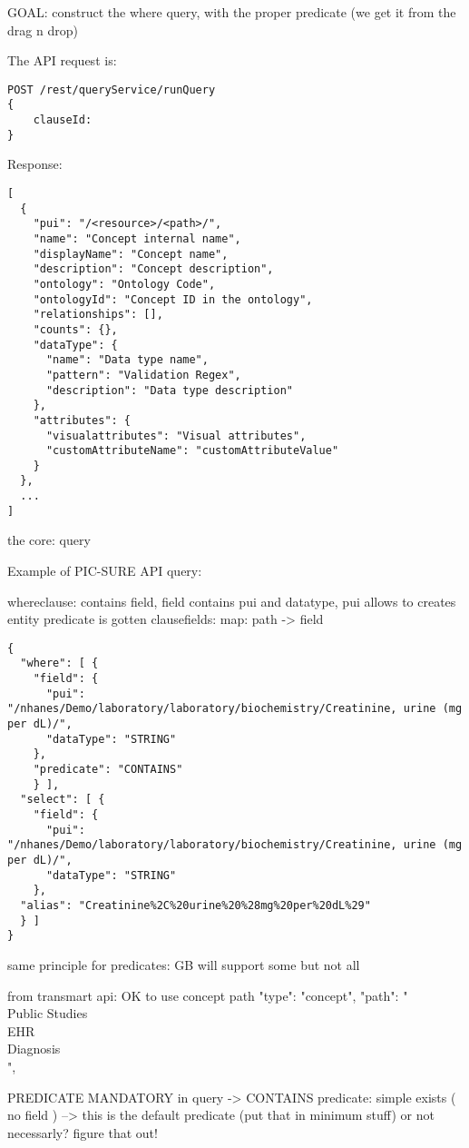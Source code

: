 GOAL: construct the where query, with the proper predicate (we get it from the drag n drop)


The API request is:
\begin{verbatim}
POST /rest/queryService/runQuery
{
    clauseId: 
}
\end{verbatim}

Response:
\begin{verbatim}
[
  {
    "pui": "/<resource>/<path>/",
    "name": "Concept internal name",
    "displayName": "Concept name",
    "description": "Concept description",
    "ontology": "Ontology Code",
    "ontologyId": "Concept ID in the ontology",
    "relationships": [],
    "counts": {},
    "dataType": {
      "name": "Data type name",
      "pattern": "Validation Regex",
      "description": "Data type description"
    },
    "attributes": {
      "visualattributes": "Visual attributes",
      "customAttributeName": "customAttributeValue"
    }
  },
  ...
]
\end{verbatim}


the core: query

Example of PIC-SURE API query:

whereclause:
contains field, field contains pui and datatype, pui allows to creates entity
predicate is gotten
clausefields: map: path -> field

\begin{verbatim}
{
  "where": [ {
    "field": {
      "pui": "/nhanes/Demo/laboratory/laboratory/biochemistry/Creatinine, urine (mg per dL)/", 
      "dataType": "STRING"
    },
    "predicate": "CONTAINS"
    } ],
  "select": [ {
    "field": {
      "pui": "/nhanes/Demo/laboratory/laboratory/biochemistry/Creatinine, urine (mg per dL)/",
      "dataType": "STRING"
    },
  "alias": "Creatinine%2C%20urine%20%28mg%20per%20dL%29"
  } ]
}
\end{verbatim}

same principle for predicates: GB will support some but not all 

from transmart api: OK to use concept path
 "type": "concept",
                "path": "\\Public Studies\\EHR\\Diagnosis\\",

PREDICATE MANDATORY in query
-> CONTAINS predicate: simple exists ( no field ) --> this is the default predicate (put that in minimum stuff) or not necessarly? figure that out!



